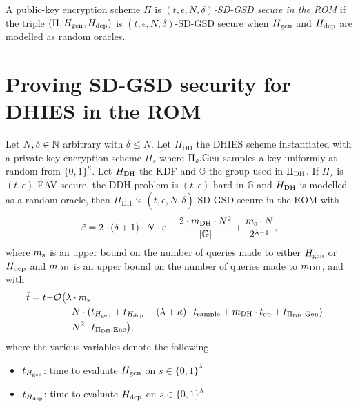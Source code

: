 \begin{definition}
	A public-key encryption scheme $\Pi$ is \emph{$(t, \epsilon, N, \delta)$-SD-GSD secure in the ROM} if the triple $(\Pi, H_\mathrm{gen}, H_\mathrm{dep})$ is $(t, \epsilon, N, \delta)$-SD-GSD secure when $H_\mathrm{gen}$ and $H_\mathrm{dep}$ are modelled as random oracles.
\end{definition}

\section{Proving SD-GSD security for DHIES in the ROM}


\begin{theorem} \label{theorem:sdgsd-security}
	Let $N, \delta \in \mathbb{N}$ arbitrary with $\delta \le N$. Let $\Pi_{\mathrm{DH}}$ the DHIES scheme instantiated with a private-key encryption scheme $\Pi_s$ where $\Pi_s.\mathrm{Gen}$ samples a key uniformly at random from $\{0, 1\}^\kappa$. Let $H_\mathrm{DH}$ the KDF and $\mathbb{G}$ the group used in $\Pi_{\mathrm{DH}}$. If $\Pi_s$ is $(t, \epsilon)$-EAV secure, the DDH problem is $(t, \epsilon)$-hard in $\mathbb{G}$ and $H_\mathrm{DH}$ is modelled as a random oracle, then $\Pi_{\mathrm{DH}}$ is $(\tilde{t}, \tilde{\epsilon}, N, \delta)$-SD-GSD secure in the ROM with
	\[
		\tilde{\varepsilon} = 2 \cdot (\delta + 1) \cdot N \cdot \varepsilon + \frac{2 \cdot m_\mathrm{DH} \cdot N^2}{\lvert\mathbb{G}\rvert} + \frac{m_\mathrm{s} \cdot N}{2^{\lambda - 1}},
	\]
	where $m_\mathrm{s}$ is an upper bound on the number of queries made to either $H_\mathrm{gen}$ or $H_\mathrm{dep}$ and $m_\mathrm{DH}$ is an upper bound on the number of queries made to $m_\mathrm{DH}$, and with
	\[
		\tilde{t} = t \begin{aligned}[t]
			- & \mathcal{O}
			\begin{aligned}[t]
				\big(  \lambda & \cdot m_\mathrm{s} \\ + & N \cdot (t_{H_\mathrm{gen}} + t_{H_\mathrm{dep}} + (\lambda + \kappa) \cdot t_{\mathrm{sample}} + m_\mathrm{DH} \cdot t_{\mathrm{op}} + t_{\Pi_{\mathrm{DH}}.\mathrm{Gen}})  \\ + & N^2 \cdot t_{\Pi_{\mathrm{DH}}.\mathrm{Enc}}\big), \\
			\end{aligned}
		\end{aligned}
	\]
	where the various variables denote the following
	\begin{itemize}
		\item $t_{H_\mathrm{gen}}$: time to evaluate $H_\mathrm{gen}$ on $s \in \{0, 1\}^\lambda$
		\item $t_{H_\mathrm{dep}}$: time to evaluate $H_\mathrm{dep}$ on $s \in \{0, 1\}^\lambda$

\end{itemize}
\end{theorem}
